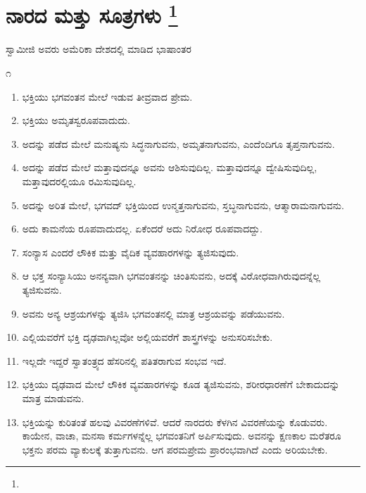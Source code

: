 
\chapter[ನಾರದ ಮತ್ತು ಸೂತ್ರಗಳು ]{ನಾರದ ಮತ್ತು ಸೂತ್ರಗಳು \protect\footnote{}}

\centerline{ಸ್ವಾಮೀಜಿ ಅವರು ಅಮೆರಿಕಾ ದೇಶದಲ್ಲಿ ಮಾಡಿದ ಭಾಷಾಂತರ}

\begin{center}
೧
\end{center}

\begin{enumerate}
\item ಭಕ್ತಿಯು ಭಗವಂತನ ಮೇಲೆ ಇಡುವ ತೀವ್ರವಾದ ಪ್ರೇಮ.

 \item ಭಕ್ತಿಯು ಅಮೃತಸ್ವರೂಪವಾದುದು.

 \item ಅದನ್ನು ಪಡೆದ ಮೇಲೆ ಮನುಷ್ಯನು ಸಿದ್ಧನಾಗುವನು, ಅಮೃತನಾಗುವನು, ಎಂದೆಂದಿಗೂ ತೃಪ್ತನಾಗುವನು.

 \item ಅದನ್ನು ಪಡೆದ ಮೇಲೆ ಮತ್ತಾವುದನ್ನೂ ಅವನು ಆಶಿಸುವುದಿಲ್ಲ. ಮತ್ತಾವುದನ್ನೂ ದ್ವೇಷಿಸುವುದಿಲ್ಲ, ಮತ್ತಾವುದರಲ್ಲಿಯೂ ರಮಿಸುವುದಿಲ್ಲ.

 \item ಅದನ್ನು ಅರಿತ ಮೇಲೆ, ಭಗವದ್​ ಭಕ್ತಿಯಿಂದ ಉನ್ಮತ್ತನಾಗುವನು, ಸ್ತಬ್ಧನಾಗುವನು, ಆತ್ಮಾರಾಮನಾಗುವನು.

 \item ಅದು ಕಾಮನೆಯ ರೂಪವಾದುದಲ್ಲ. ಏಕೆಂದರೆ ಅದು ನಿರೋಧ ರೂಪವಾದದ್ದು.

 \item ಸಂನ್ಯಾಸ ಎಂದರೆ ಲೌಕಿಕ ಮತ್ತು ವೈದಿಕ ವ್ಯವಹಾರಗಳನ್ನು ತ್ಯಜಿಸುವುದು.

 \item ಆ ಭಕ್ತ ಸಂನ್ಯಾಸಿಯು ಅನನ್ಯವಾಗಿ ಭಗವಂತನನ್ನು ಚಿಂತಿಸುವನು, ಅದಕ್ಕೆ ವಿರೋಧವಾಗಿರುವುದನ್ನೆಲ್ಲ ತ್ಯಜಿಸುವನು.

 \item ಅವನು ಅನ್ಯ ಆಶ್ರಯಗಳನ್ನು ತ್ಯಜಿಸಿ ಭಗವಂತನಲ್ಲಿ ಮಾತ್ರ ಆಶ್ರಯವನ್ನು ಪಡೆಯುವನು.

 \item ಎಲ್ಲಿಯವರೆಗೆ ಭಕ್ತಿ ದೃಢವಾಗಿಲ್ಲವೋ ಅಲ್ಲಿಯವರೆಗೆ ಶಾಸ್ತ್ರಗಳನ್ನು ಅನುಸರಿಸಬೇಕು.

 \item ಇಲ್ಲದೇ ಇದ್ದರೆ ಸ್ವಾತಂತ್ರ್ಯದ ಹೆಸರಿನಲ್ಲಿ ಪತಿತರಾಗುವ ಸಂಭವ ಇದೆ.

 \item ಭಕ್ತಿಯು ದೃಢವಾದ ಮೇಲೆ ಲೌಕಿಕ ವ್ಯವಹಾರಗಳನ್ನು ಕೂಡ ತ್ಯಜಿಸುವನು, ಶರೀರಧಾರಣೆಗೆ ಬೇಕಾದುದನ್ನು ಮಾತ್ರ ಮಾಡುವನು.

 \item ಭಕ್ತಿಯನ್ನು ಕುರಿತಂತೆ ಹಲವು ವಿವರಣೆಗಳಿವೆ. ಆದರೆ ನಾರದರು ಕೆಳಗಿನ ವಿವರಣೆಯನ್ನು ಕೊಡುವರು. ಕಾಯೇನ, ವಾಚಾ, ಮನಸಾ ಕರ್ಮಗಳನ್ನೆಲ್ಲ ಭಗವಂತನಿಗೆ ಅರ್ಪಿಸುವುದು. ಅವನನ್ನು ಕ್ಷಣಕಾಲ ಮರೆತರೂ ಭಕ್ತನು ಪರಮ ವ್ಯಾಕುಲಕ್ಕೆ ತುತ್ತಾಗುವನು. ಆಗ ಪರಮಪ್ರೇಮ ಪ್ರಾರಂಭವಾಗಿದೆ ಎಂದು ಅರಿಯಬೇಕು.


\end{enumerate}
